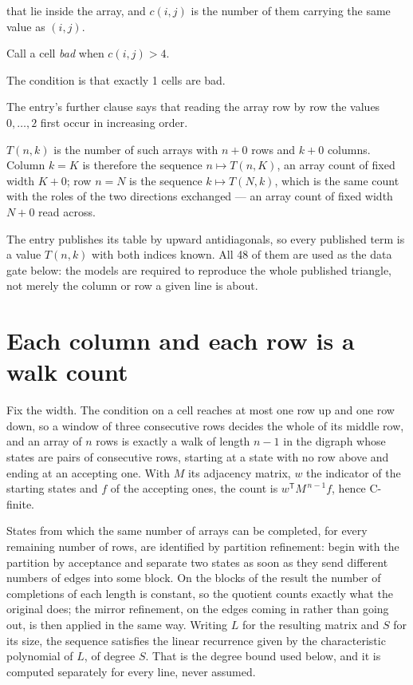 \documentclass[11pt]{article}
\theoremstyle{definition}
\begin{document}
that lie inside the array, and $c(i,j)$ is the number of them carrying the same value as $(i,j)$.

Call a cell {\itshape bad} when $c(i,j) > 4$.

The condition is that exactly 1 cells are bad.

The entry's further clause says that reading the array row by row the values $0,\dots,2$ first occur in increasing order.

$T(n,k)$ is the number of such arrays with $n + 0$ rows and $k + 0$ columns. Column $k = K$ is therefore the sequence $n \mapsto T(n,K)$, an array count of fixed width $K + 0$; row $n = N$ is the sequence $k \mapsto T(N,k)$, which is the same count with the roles of the two directions exchanged --- an array count of fixed width $N + 0$ read across.

The entry publishes its table by upward antidiagonals, so every published term is a value $T(n,k)$ with both indices known. All 48 of them are used as the data gate below: the models are required to reproduce the whole published triangle, not merely the column or row a given line is about.

\section{Each column and each row is a walk count}

Fix the width. The condition on a cell reaches at most one row up and one row down, so a window of three consecutive rows decides the whole of its middle row, and an array of $n$ rows is exactly a walk of length $n-1$ in the digraph whose states are pairs of consecutive rows, starting at a state with no row above and ending at an accepting one. With $M$ its adjacency matrix, $w$ the indicator of the starting states and $f$ of the accepting ones, the count is $w^{\mathsf T}M^{\,n-1}f$, hence C-finite.

States from which the same number of arrays can be completed, for every remaining number of rows, are identified by partition refinement: begin with the partition by acceptance and separate two states as soon as they send different numbers of edges into some block. On the blocks of the result the number of completions of each length is constant, so the quotient counts exactly what the original does; the mirror refinement, on the edges coming in rather than going out, is then applied in the same way. Writing $L$ for the resulting matrix and $S$ for its size, the sequence satisfies the linear recurrence given by the characteristic polynomial of $L$, of degree $S$. That is the degree bound used below, and it is computed separately for every line, never assumed.
\end{document}
